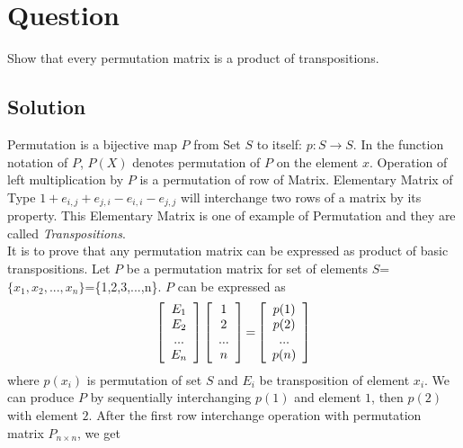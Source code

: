 \documentclass[12pt]{article}
\newcommand\tab[1][1cm]{\hspace*{#1}}
\begin{document}
\clearpage
\section{Question}
Show that every permutation matrix is a product of transpositions.
\subsection{Solution}
\noindent
\tab Permutation is a bijective map $P$ from Set $S$ to itself: $ p: S \rightarrow S$. In the function notation of $P$, $P(X)$ denotes permutation of $P$ on the element $x$. Operation of left multiplication by $P$ is a permutation of row of Matrix. Elementary Matrix of Type $1+e_{i,j}+e_{j,i}-e_{i,i}-e_{j,j}$ will interchange two rows of a matrix by its property.\label{row:op} This Elementary Matrix is one of example of Permutation and they are called \textit{Transpositions}. \\

\noindent
\tab It is to prove that any permutation  matrix can be expressed as product of basic transpositions. Let $P$ be a permutation matrix for set of elements $S$=$\{x_1,x_2,...,x_n\}$=\{1,2,3,...,n\}. $P$ can be expressed as
\[ \left[ \begin{array}{ccc}
  E_1 \\
  E_2 \\
  ... \\
  E_n \\
\end{array} \right]
\left[ \begin{array}{ccc}
  1 \\
  2 \\
  ... \\
  n \\  
\end{array} \right]
\textnormal{=} 
\left[ \begin{array}{ccc}
  p(1) \\
  p(2) \\
  ... \\
  p(n) \\
\end{array} \right]
\]
\noindent
\tab where $p(x_i)$ is permutation of set $S$ and $E_i$ be transposition of element $x_i$. We can produce $P$ by sequentially interchanging $p(1)$  and element $1$, then $p(2)$ with element $2$. After the first row interchange operation with permutation matrix $P_{n\times n}$, we get
\end{document}
